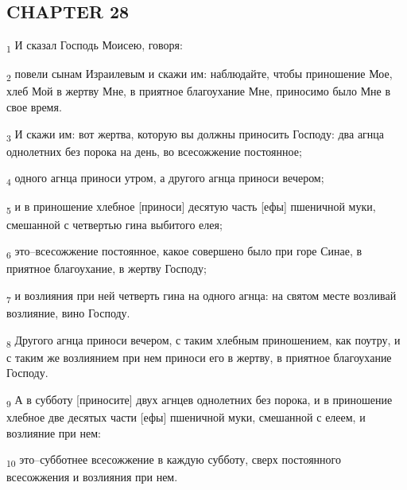 \subsection{CHAPTER 28}
\begin{tcolorbox}
\textsubscript{1} И сказал Господь Моисею, говоря:
\end{tcolorbox}
\begin{tcolorbox}
\textsubscript{2} повели сынам Израилевым и скажи им: наблюдайте, чтобы приношение Мое, хлеб Мой в жертву Мне, в приятное благоухание Мне, приносимо было Мне в свое время.
\end{tcolorbox}
\begin{tcolorbox}
\textsubscript{3} И скажи им: вот жертва, которую вы должны приносить Господу: два агнца однолетних без порока на день, во всесожжение постоянное;
\end{tcolorbox}
\begin{tcolorbox}
\textsubscript{4} одного агнца приноси утром, а другого агнца приноси вечером;
\end{tcolorbox}
\begin{tcolorbox}
\textsubscript{5} и в приношение хлебное [приноси] десятую часть [ефы] пшеничной муки, смешанной с четвертью гина выбитого елея;
\end{tcolorbox}
\begin{tcolorbox}
\textsubscript{6} это--всесожжение постоянное, какое совершено было при горе Синае, в приятное благоухание, в жертву Господу;
\end{tcolorbox}
\begin{tcolorbox}
\textsubscript{7} и возлияния при ней четверть гина на одного агнца: на святом месте возливай возлияние, вино Господу.
\end{tcolorbox}
\begin{tcolorbox}
\textsubscript{8} Другого агнца приноси вечером, с таким хлебным приношением, как поутру, и с таким же возлиянием при нем приноси его в жертву, в приятное благоухание Господу.
\end{tcolorbox}
\begin{tcolorbox}
\textsubscript{9} А в субботу [приносите] двух агнцев однолетних без порока, и в приношение хлебное две десятых части [ефы] пшеничной муки, смешанной с елеем, и возлияние при нем:
\end{tcolorbox}
\begin{tcolorbox}
\textsubscript{10} это--субботнее всесожжение в каждую субботу, сверх постоянного всесожжения и возлияния при нем.
\end{tcolorbox}
